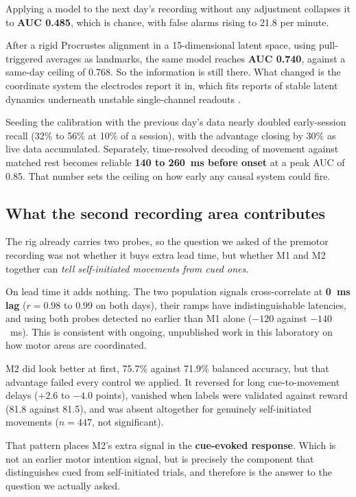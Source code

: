 \documentclass[11pt]{article}
\begin{document}
Applying a model to the next day's recording without any adjustment collapses it
to \textbf{AUC 0.485}, which is chance, with false alarms rising to 21.8 per
minute.

After a rigid Procrustes alignment in a 15-dimensional latent space, using
pull-triggered averages as landmarks, the same model reaches \textbf{AUC 0.740},
against a same-day ceiling of 0.768. So the information is still there. What
changed is the coordinate system the electrodes report it in, which fits reports
of stable latent dynamics underneath unstable single-channel readouts
\cite{gallego2020,degenhart2020}.

Seeding the calibration with the previous day's data nearly doubled early-session
recall (32\% to 56\% at 10\% of a session), with the advantage closing by 30\% as
live data accumulated. Separately, time-resolved decoding of movement against
matched rest becomes reliable \textbf{140 to 260~ms before onset} at a peak AUC
of 0.85. That number sets the ceiling on how early any causal system could fire.

\subsection{What the second recording area contributes}

The rig already carries two probes, so the question we asked of the premotor
recording was not whether it buys extra lead time, but whether M1 and M2 together
can \emph{tell self-initiated movements from cued ones}.

On lead time it adds nothing. The two population signals cross-correlate at
\textbf{0~ms lag} ($r = 0.98$ to $0.99$ on both days), their ramps have
indistinguishable latencies, and using both probes detected no earlier than M1
alone ($-120$ against $-140$~ms). This is consistent with
ongoing, unpublished work in this laboratory on how motor areas are
coordinated.

M2 did look better at first, 75.7\% against 71.9\% balanced accuracy, but that
advantage failed every control we applied. It reversed for long cue-to-movement
delays ($+2.6$ to $-4.0$ points), vanished when labels were validated against
reward (81.8 against 81.5), and was absent altogether for genuinely
self-initiated movements ($n = 447$, not significant).

That pattern places M2's extra signal in the \textbf{cue-evoked response}. Which
is not an earlier motor intention signal, but is precisely the component that
distinguishes cued from self-initiated trials, and therefore is the answer to the
question we actually asked.
\end{document}
